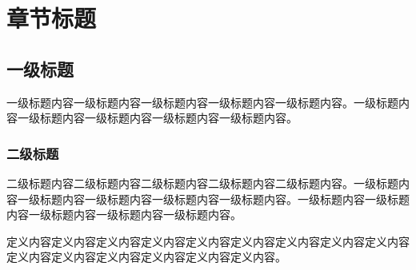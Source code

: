 \chapter{章节标题}

\section{一级标题}

一级标题内容一级标题内容一级标题内容一级标题内容一级标题内容。一级标题内容一级标题内容一级标题内容一级标题内容一级标题内容。

\subsection{二级标题}

二级标题内容二级标题内容二级标题内容二级标题内容二级标题内容。一级标题内容一级标题内容一级标题内容一级标题内容一级标题内容。一级标题内容一级标题内容一级标题内容一级标题内容一级标题内容。

\begin{definition}[定义环境测试]
    定义内容定义内容定义内容定义内容定义内容定义内容定义内容定义内容定义内容定义内容定义内容定义内容定义内容定义内容定义内容。
\end{definition}
